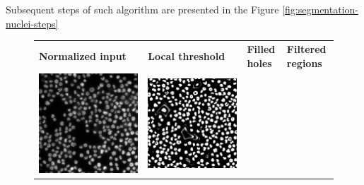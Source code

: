 Subsequent steps of such algorithm are presented in the Figure \ref{fig:segmentation-nuclei-steps}

\begin{figure}[H]
    \centering
    \centering
        \begin{tabularx}{\textwidth}{YYYY}
            \textbf{Normalized input} &
            \textbf{Local threshold} &
            \textbf{Filled holes} &
            \textbf{Filtered regions} \\
            \includegraphics{bilder/segmentation/nuclei-mask/normalized.png} & \includegraphics{bilder/segmentation/nuclei-mask/binary_local.png} &

\end{tabularx}
\end{figure}
